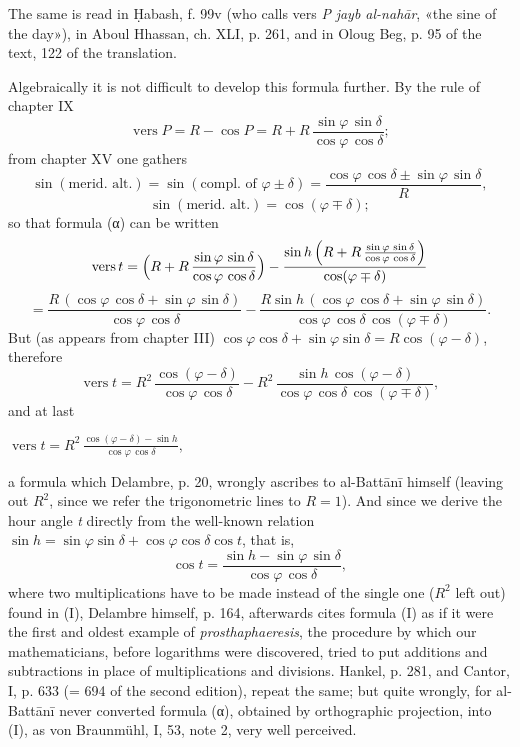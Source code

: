 \documentclass[11pt]{article}
\newcommand{\Pg}[1]{\marginpar{\footnotesize\color{gray}#1}}
\begin{document}
\par The same is read in Ḥabash, f. 99v (who calls vers \emph{P} \emph{jayb al-nahār}, «the sine of the day»), in Aboul Hhassan, ch. XLI, p. 261, and in Oloug Beg, p. 95 of the text, 122 of the translation.\par
\par \Pg{I 191}Algebraically it is not difficult to develop this formula further. By the rule of chapter IX \[ \operatorname{vers} P = R - \cos P = R + R\,\frac{\sin\varphi\,\sin\delta}{\cos\varphi\,\cos\delta}; \] from chapter XV one gathers \[ \sin(\text{merid. alt.}) = \sin(\text{compl. of }\varphi \pm \delta) = \frac{\cos\varphi\,\cos\delta \pm \sin\varphi\,\sin\delta}{R}, \] \[ \sin(\text{merid. alt.}) = \cos(\varphi \mp \delta); \] so that formula ({\greekfont α}) can be written \[ \operatorname{vers} t = \Bigl(R + R\,\frac{\sin\varphi\,\sin\delta}{\cos\varphi\,\cos\delta}\Bigr) - \frac{\sin h\,\Bigl(R + R\,\frac{\sin\varphi\,\sin\delta}{\cos\varphi\,\cos\delta}\Bigr)}{\cos(\varphi \mp \delta)} \] \[ = \frac{R\,(\cos\varphi\,\cos\delta + \sin\varphi\,\sin\delta)}{\cos\varphi\,\cos\delta} - \frac{R\sin h\,(\cos\varphi\,\cos\delta + \sin\varphi\,\sin\delta)}{\cos\varphi\,\cos\delta\,\cos(\varphi \mp \delta)}. \] But (as appears from chapter III) $\cos\varphi\cos\delta + \sin\varphi\sin\delta = R\cos(\varphi - \delta)$, therefore \[ \operatorname{vers} t = R^2\,\frac{\cos(\varphi - \delta)}{\cos\varphi\,\cos\delta} - R^2\,\frac{\sin h\,\cos(\varphi - \delta)}{\cos\varphi\,\cos\delta\,\cos(\varphi \mp \delta)}, \] and at last \par\noindent\hspace*{1.5em}$\displaystyle \operatorname{vers} t = R^2\,\frac{\cos(\varphi - \delta) - \sin h}{\cos\varphi\,\cos\delta},$\par a formula which Delambre, p. 20, wrongly ascribes to al-Battānī himself (leaving out $R^2$, since we refer the trigonometric lines to $R = 1$). And since we derive the hour angle \emph{t} directly from the well-known relation $\sin h = \sin\varphi\sin\delta + \cos\varphi\cos\delta\cos t$, that is, \[ \cos t = \frac{\sin h - \sin\varphi\,\sin\delta}{\cos\varphi\,\cos\delta}, \] where two multiplications have to be made instead of the single one ($R^2$ left out) found in (I), Delambre himself, p. 164, afterwards cites formula (I) as if it were the first and oldest example of \emph{prosthaphaeresis}, the procedure by which our mathematicians, before logarithms were discovered, tried to put additions and subtractions in place of multiplications and divisions. Hankel, p. 281, and Cantor, I, p. 633 (= 694 of the second edition), repeat the same; but quite wrongly, for al-Battānī never converted formula ({\greekfont α}), obtained by orthographic projection, into (I), as von Braunmühl, I, 53, note 2, very well perceived.\par
\end{document}
